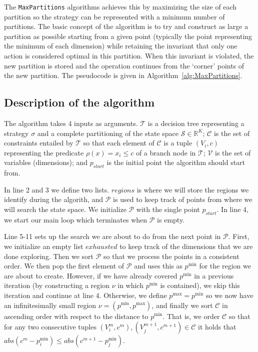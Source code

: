 The \texttt{MaxPartitions} algorithms achieves this by maximizing the size of
each partition so the strategy can be represented with a minimum number of
partitions. The basic concept of the algorithm is to try and construct as large
a partition as possible starting from a given point (typically the point
representing the minimum of each dimension) while retaining the invariant that
only one action is considered optimal in this partition. When this invariant is
violated, the new partition is stored and the operation continues from the
`corner' points of the new partition.  The pseudocode is given in
Algorithm~\ref{alg:MaxPartitions}.

\subsection{Description of the algorithm}%
\label{sub:maxPartsDescription}

The algorithm takes 4 inputs as arguments. $\mathcal{T}$ is a decision tree
representing a strategy $\sigma$ and a complete partitioning of the state space
$\mathcal{S} \in \mathbb{R}^K$; $\mathcal{C}$ is the set of constraints entailed
by $\mathcal{T}$ so that each element of $\mathcal{C}$ is a tuple $(V_i, c)$
representing the predicate $\rho(x) = x_i \le c$ of a branch node in
$\mathcal{T}$; $\mathcal{V}$ is the set of variables (dimensions); and
$p_{start}$ is the initial point the algorithm should start from.

In line 2 and 3 we define two lists. $regions$ is where we will store the
regions we identify during the algorith, and $\mathcal{P}$ is used to keep track
of points from where we will search the state space. We initialize
$\mathcal{P}$ with the single point $p_{start}$. In line 4, we start our main
loop which terminates when $\mathcal{P}$ is empty.

Line 5-11 sets up the search we are about to do from the next point in
$\mathcal{P}$. First, we initialize an empty list $exhausted$ to keep track of
the dimensions that we are done exploring. Then we sort $\mathcal{P}$ so that we
process the points in a consistent order. We then pop the first element of
$\mathcal{P}$ and uses this as $p^{\min}$ for the region we are about to create.
However, if we have already covered $p^{\min}$ in a previous iteration (by
constructing a region $\nu$ in which $p^{\min}$ is contained), we skip this
iteration and continue at line 4. Otherwise, we define $p^{\max} = p^{\min}$ so
we now have an infinitesimally small region $\nu = (p^{\min},p^{\max})$, and
finally we sort $\mathcal{C}$ in ascending order with respect to the distance to
$p^{\min}$. That is, we order $\mathcal{C}$ so that for any two consecutive
tuples $(V^m_i, c^m), (V^{m+1}_j, c^{m+1}) \in \mathcal{C}$ it holds that
$abs(c^m - p^{\min}_i) \le  abs(c^{m+1} - p^{\min}_j)$.

